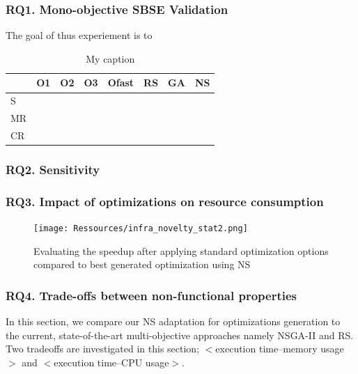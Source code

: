 \subsubsection{RQ1. Mono-objective SBSE Validation}
The goal of thus experiement is to 
\begin{table}[h]
	\centering
	\caption{My caption}
	\label{my-label}
	\begin{tabular}{|l|l|l|l|l|l|l|c|}
		\hline
		& O1                    & O2                    & O3                    & Ofast                 & RS                    & GA                    & NS \\ \hline
		S  & \multicolumn{1}{c|}{} & \multicolumn{1}{c|}{} & \multicolumn{1}{c|}{} & \multicolumn{1}{c|}{} & \multicolumn{1}{c|}{} & \multicolumn{1}{c|}{} &    \\ \hline
		MR &                       &                       &                       &                       &                       &                       &    \\ \hline
		CR &                       &                       &                       &                       &                       &                       &    \\ \hline
	\end{tabular}
\end{table}
\subsubsection{RQ2. Sensitivity}
\subsubsection{RQ3. Impact of optimizations on resource consumption}
\begin{figure}[h]
	\centering
	\texttt{[image: Ressources/infra\_novelty\_stat2.png]}
	\caption{Evaluating the speedup after applying standard optimization options compared to best generated optimization using NS}
\end{figure}
\subsubsection{RQ4. Trade-offs between non-functional properties}
In this section, we compare our NS adaptation for optimizations generation to the current, state-of-the-art multi-objective approaches namely NSGA-II and RS. Two tradeoffs are investigated in this section; $<$execution time--memory usage$>$ and $<$execution time--CPU usage$>$.

